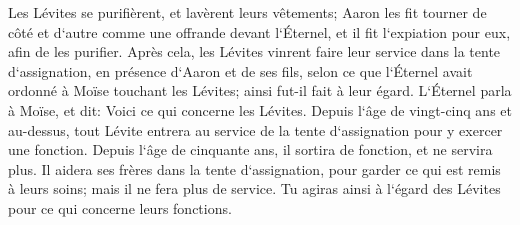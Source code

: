 \verse Les Lévites se purifièrent, et lavèrent leurs vêtements; Aaron les fit tourner de côté et d`autre comme une offrande devant l`Éternel, et il fit l`expiation pour eux, afin de les purifier. 
\verse Après cela, les Lévites vinrent faire leur service dans la tente d`assignation, en présence d`Aaron et de ses fils, selon ce que l`Éternel avait ordonné à Moïse touchant les Lévites; ainsi fut-il fait à leur égard. 
\verse L`Éternel parla à Moïse, et dit: 
\verse Voici ce qui concerne les Lévites. Depuis l`âge de vingt-cinq ans et au-dessus, tout Lévite entrera au service de la tente d`assignation pour y exercer une fonction. 
\verse Depuis l`âge de cinquante ans, il sortira de fonction, et ne servira plus. 
\verse Il aidera ses frères dans la tente d`assignation, pour garder ce qui est remis à leurs soins; mais il ne fera plus de service. Tu agiras ainsi à l`égard des Lévites pour ce qui concerne leurs fonctions. 

\chapter{}

